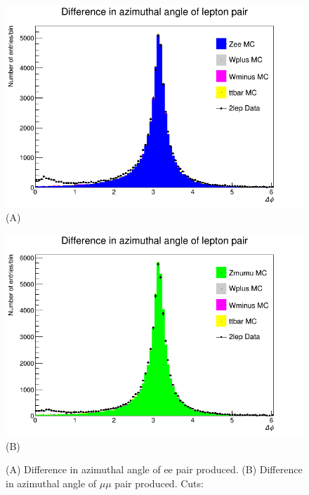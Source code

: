 \begin{figure}[h!]
    \centering
    \begin{minipage}{0.5\textwidth}
        \centering
        \includegraphics[width=\linewidth]{plots/25-02-2021/Zee-Stack_delta-phi_(min-cuts_2lep=ee)_25-02-21_09-25.png}
        (A)
    \end{minipage}\hfill
    \begin{minipage}{0.5\textwidth}
        \centering
        \includegraphics[width=\linewidth]{plots/25-02-2021/Zmumu-Stack_delta-phi_(min-cuts_2lep=mumu)_25-02-21_09-38.png}
        (B)
    \end{minipage}
    \caption{(A) Difference in azimuthal angle of ee pair produced. (B) Difference in azimuthal angle of $\mu\mu$ pair produced.  Cuts: }
    \label{fig:Zee-Stack_delta-phi_(min-cuts_2lep=ll)_25-02-21}
\end{figure}

